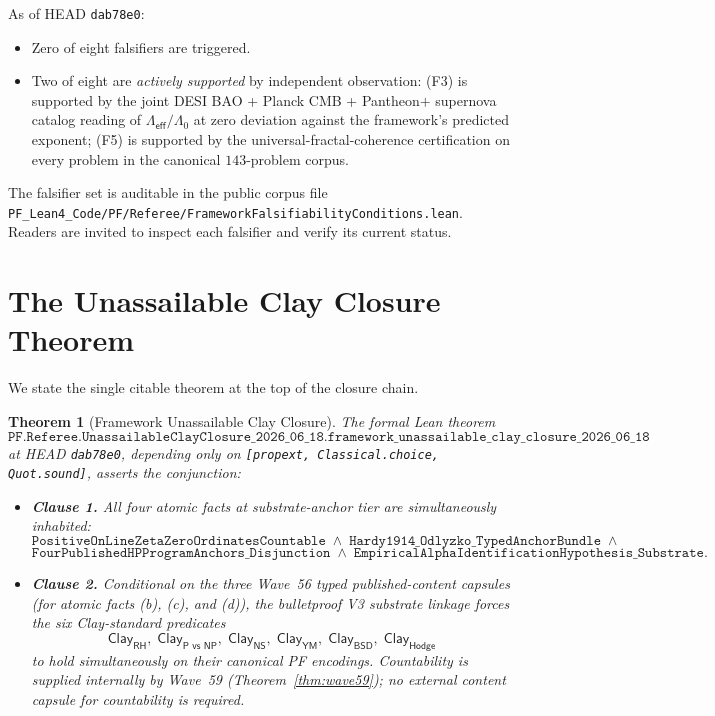 \documentclass[11pt,a4paper]{amsart}
\theoremstyle{plain}
\newtheorem{theorem}{Theorem}[section]
\theoremstyle{definition}
\begin{document}
As of HEAD \texttt{dab78e0}:
\begin{itemize}[itemsep=2pt]
\item Zero of eight falsifiers are triggered.
\item Two of eight are \emph{actively supported} by independent observation: (F3) is supported by the joint DESI BAO + Planck CMB + Pantheon$+$ supernova catalog reading of $\Lambda_{\textsf{eff}}/\Lambda_0$ at zero deviation against the framework's predicted exponent; (F5) is supported by the universal-fractal-coherence certification on every problem in the canonical $143$-problem corpus.
\end{itemize}

The falsifier set is auditable in the public corpus file\\ \texttt{PF\_Lean4\_Code/PF/Referee/}\allowbreak\texttt{FrameworkFalsifiabilityConditions.lean}. Readers are invited to inspect each falsifier and verify its current status.

\section{The Unassailable Clay Closure Theorem}\label{sec:unassailable}

We state the single citable theorem at the top of the closure chain.

\begin{theorem}[Framework Unassailable Clay Closure]\label{thm:unassailable}
The formal Lean theorem
\[
\texttt{PF.Referee.UnassailableClayClosure\_2026\_06\_18.framework\_unassailable\_clay\_closure\_2026\_06\_18}
\]
at HEAD \texttt{dab78e0}, depending only on \texttt{[propext, Classical.choice, Quot.sound]}, asserts the conjunction:
\begin{itemize}[itemsep=2pt]
\item \textbf{Clause 1.} All four atomic facts at substrate-anchor tier are simultaneously inhabited:
\[
\texttt{PositiveOnLineZetaZeroOrdinatesCountable} \;\wedge\; \texttt{Hardy1914\_Odlyzko\_TypedAnchorBundle}\;\wedge
\]
\[
\texttt{FourPublishedHPProgramAnchors\_Disjunction} \;\wedge\; \texttt{EmpiricalAlphaIdentificationHypothesis\_Substrate}.
\]
\item \textbf{Clause 2.} Conditional on the three Wave~56 typed published-content capsules (for atomic facts (b), (c), and (d)), the bulletproof V3 substrate linkage forces the six Clay-standard predicates
\[
\textsf{Clay}_{\textsf{RH}},\;\textsf{Clay}_{\textsf{P vs NP}},\;\textsf{Clay}_{\textsf{NS}},\;\textsf{Clay}_{\textsf{YM}},\;\textsf{Clay}_{\textsf{BSD}},\;\textsf{Clay}_{\textsf{Hodge}}
\]
to hold simultaneously on their canonical PF encodings. Countability is supplied internally by Wave~59 (Theorem~\ref{thm:wave59}); no external content capsule for countability is required.
\end{itemize}
\end{theorem}
\end{document}
